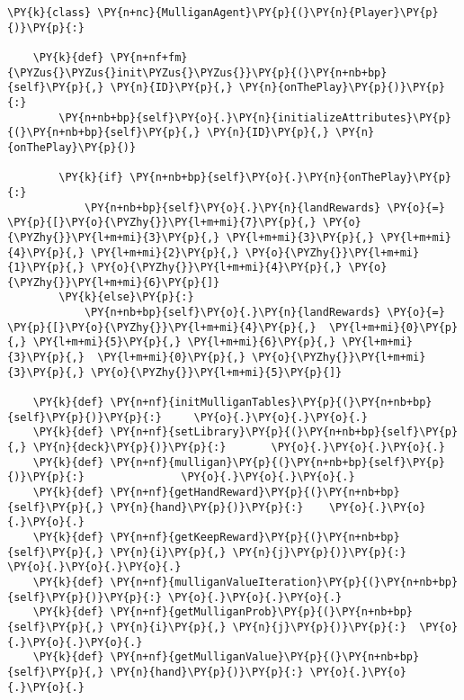 \begin{Verbatim}[commandchars=\\\{\}]
\PY{k}{class} \PY{n+nc}{MulliganAgent}\PY{p}{(}\PY{n}{Player}\PY{p}{)}\PY{p}{:}

    \PY{k}{def} \PY{n+nf+fm}{\PYZus{}\PYZus{}init\PYZus{}\PYZus{}}\PY{p}{(}\PY{n+nb+bp}{self}\PY{p}{,} \PY{n}{ID}\PY{p}{,} \PY{n}{onThePlay}\PY{p}{)}\PY{p}{:}
        \PY{n+nb+bp}{self}\PY{o}{.}\PY{n}{initializeAttributes}\PY{p}{(}\PY{n+nb+bp}{self}\PY{p}{,} \PY{n}{ID}\PY{p}{,} \PY{n}{onThePlay}\PY{p}{)}

        \PY{k}{if} \PY{n+nb+bp}{self}\PY{o}{.}\PY{n}{onThePlay}\PY{p}{:}
            \PY{n+nb+bp}{self}\PY{o}{.}\PY{n}{landRewards} \PY{o}{=} \PY{p}{[}\PY{o}{\PYZhy{}}\PY{l+m+mi}{7}\PY{p}{,} \PY{o}{\PYZhy{}}\PY{l+m+mi}{3}\PY{p}{,} \PY{l+m+mi}{3}\PY{p}{,} \PY{l+m+mi}{4}\PY{p}{,} \PY{l+m+mi}{2}\PY{p}{,} \PY{o}{\PYZhy{}}\PY{l+m+mi}{1}\PY{p}{,} \PY{o}{\PYZhy{}}\PY{l+m+mi}{4}\PY{p}{,} \PY{o}{\PYZhy{}}\PY{l+m+mi}{6}\PY{p}{]}
        \PY{k}{else}\PY{p}{:}
            \PY{n+nb+bp}{self}\PY{o}{.}\PY{n}{landRewards} \PY{o}{=} \PY{p}{[}\PY{o}{\PYZhy{}}\PY{l+m+mi}{4}\PY{p}{,}  \PY{l+m+mi}{0}\PY{p}{,} \PY{l+m+mi}{5}\PY{p}{,} \PY{l+m+mi}{6}\PY{p}{,} \PY{l+m+mi}{3}\PY{p}{,}  \PY{l+m+mi}{0}\PY{p}{,} \PY{o}{\PYZhy{}}\PY{l+m+mi}{3}\PY{p}{,} \PY{o}{\PYZhy{}}\PY{l+m+mi}{5}\PY{p}{]}

    \PY{k}{def} \PY{n+nf}{initMulliganTables}\PY{p}{(}\PY{n+nb+bp}{self}\PY{p}{)}\PY{p}{:}     \PY{o}{.}\PY{o}{.}\PY{o}{.}
    \PY{k}{def} \PY{n+nf}{setLibrary}\PY{p}{(}\PY{n+nb+bp}{self}\PY{p}{,} \PY{n}{deck}\PY{p}{)}\PY{p}{:}       \PY{o}{.}\PY{o}{.}\PY{o}{.}
    \PY{k}{def} \PY{n+nf}{mulligan}\PY{p}{(}\PY{n+nb+bp}{self}\PY{p}{)}\PY{p}{:}               \PY{o}{.}\PY{o}{.}\PY{o}{.}
    \PY{k}{def} \PY{n+nf}{getHandReward}\PY{p}{(}\PY{n+nb+bp}{self}\PY{p}{,} \PY{n}{hand}\PY{p}{)}\PY{p}{:}    \PY{o}{.}\PY{o}{.}\PY{o}{.}
    \PY{k}{def} \PY{n+nf}{getKeepReward}\PY{p}{(}\PY{n+nb+bp}{self}\PY{p}{,} \PY{n}{i}\PY{p}{,} \PY{n}{j}\PY{p}{)}\PY{p}{:}    \PY{o}{.}\PY{o}{.}\PY{o}{.}
    \PY{k}{def} \PY{n+nf}{mulliganValueIteration}\PY{p}{(}\PY{n+nb+bp}{self}\PY{p}{)}\PY{p}{:} \PY{o}{.}\PY{o}{.}\PY{o}{.}
    \PY{k}{def} \PY{n+nf}{getMulliganProb}\PY{p}{(}\PY{n+nb+bp}{self}\PY{p}{,} \PY{n}{i}\PY{p}{,} \PY{n}{j}\PY{p}{)}\PY{p}{:}  \PY{o}{.}\PY{o}{.}\PY{o}{.}
    \PY{k}{def} \PY{n+nf}{getMulliganValue}\PY{p}{(}\PY{n+nb+bp}{self}\PY{p}{,} \PY{n}{hand}\PY{p}{)}\PY{p}{:} \PY{o}{.}\PY{o}{.}\PY{o}{.}
\end{Verbatim}
